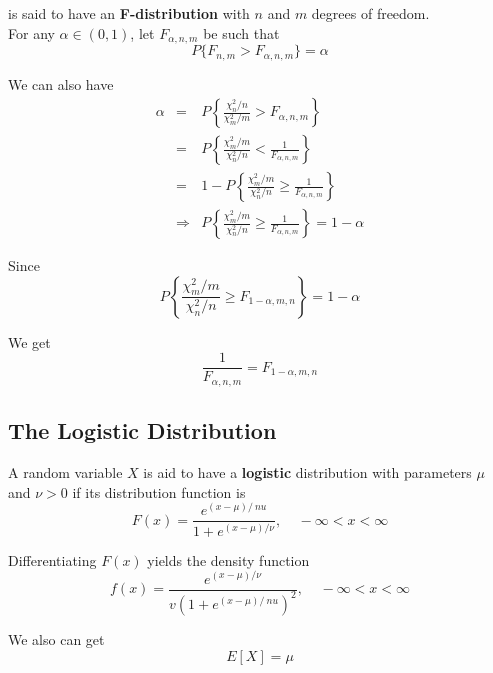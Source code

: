\documentclass[12pt]{article}
\begin{document}
is said to have an \textbf{F-distribution} with $n$ and $m$ degrees of freedom. \\

For any $\alpha \in (0,1)$, let $F_{\alpha, n, m}$ be such that
\begin{equation*}
  P \{ F_{n,m} > F_{\alpha, n, m} \} = \alpha
\end{equation*}

We can also have
\begin{eqnarray*}
  \alpha
  &=& P \left\{ \frac{\chi_n^2/n}{\chi_m^2/m} > F_{\alpha, n, m} \right\} \\
  &=& P \left\{ \frac{\chi_m^2/m}{\chi_n^2/n}
      < \frac{1}{F_{\alpha, n, m}} \right\} \\
  &=& 1 - P \left\{ \frac{\chi_m^2/m}{\chi_n^2/n}
      \ge \frac{1}{F_{\alpha, n, m}} \right\} \\
  &\Rightarrow& P \left\{ \frac{\chi_m^2/m}{\chi_n^2/n}
      \ge \frac{1}{F_{\alpha, n, m}} \right\} = 1 - \alpha
\end{eqnarray*}

Since
\begin{equation*}
  P \left\{ \frac{\chi_m^2/m}{\chi_n^2/n} 
    \ge F_{1 - \alpha, m, n} \right \} = 1 - \alpha  
\end{equation*}

We get
\begin{equation*}
  \frac{1}{F_{\alpha, n, m}} = F_{1 - \alpha, m, n}
\end{equation*}

\subsection{The Logistic Distribution}

A random variable $X$ is aid to have a \textbf{logistic} distribution with parameters $\mu$ and $\nu > 0$ if its distribution function is
\begin{equation*}
  F(x) = \frac {e^{(x - \mu)/ \ nu}}{1 + e^{(x - \mu)/ \nu}},
  \;\;\;\; -\infty < x < \infty
\end{equation*}

Differentiating $F(x)$ yields the density function
\begin{equation*}
  f(x) = \frac {e^{(x - \mu)/ \nu}}{v(1 + e^{(x - \mu)/ \ nu})^2},
  \;\;\;\; -\infty < x < \infty
\end{equation*}

We also can get
\begin{equation*}
  E[X] = \mu
\end{equation*}
\end{document}
